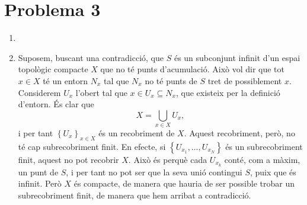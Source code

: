 \documentclass[12pt]{article}
\numberwithin{table}{section}
\numberwithin{figure}{section}
\numberwithin{equation}{section}
\newcommand{\set}[1]{\left\{ #1\right\}}
\begin{document}
\section*{Problema 3}
\begin{enumerate}[label=(\alph*), font=\bfseries \sffamily, wide, labelwidth=!, labelindent=0pt]
	\item 
	\item Suposem, buscant una contradicció, que \( S \) és un subconjunt infinit d'un espai topològic compacte \( X \) que no té punts d'acumulació. Això vol dir que tot \( x \in X \) té un entorn \( N_x \) tal que \( N_x \) no té punts de \( S \) tret de possiblement \( x \). Considerem \( U_x \) l'obert tal que \( x \in U_x \subseteq N_x \), que existeix per la definició d'entorn. És clar que 
		\begin{equation*}
		X = \bigcup_{x \in X} U_x,
		\end{equation*}
		i per tant \( \set{U_x}_{x \in X} \) és un recobriment de \( X \). Aquest recobriment, però, no té cap subrecobriment finit. En efecte, si \( \set{U_{x_1}, \dots, U_{x_N}} \) és un subrecobriment finit, aquest no pot recobrir \( X \). Això és perquè cada \( U_{x_k} \) conté, com a màxim, un punt de \( S \), i per tant no pot ser que la seva unió contingui \( S \), puix que és infinit. Però \( X \) és compacte, de manera que hauria de ser possible trobar un subrecobriment finit, de manera que hem arribat a contradicció.  
\end{enumerate}
\end{document}
